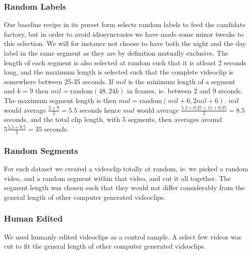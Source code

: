 \subsubsection{Random Labels}
% 
Our baseline recipe in its purest form selects random labels to feed the candidate factory, but in order to avoid idiosyncrasies we have made some minor tweaks to this selection. We will for instance not choose to have both the night and the day label in the same segment as they are by definition mutually exclusive. The length of each segment is also selected at random such that it is atleast 2 seconds long, and the maximum length is selected such that the complete videoclip is somewhere between 25-35 seconds. If $mil$ is the minimum length of a segment and $k=9$ then $mil=\text{random}(48,24k)$ in frames, ie. between 2 and 9 seconds. The maximum segment length is then $mal=\text{random}(mil+6, 2mil+6)$. $mil$ would average $\frac{2+9}{2}=5.5$ seconds hence $mal$ would average $\frac{5.5+0.25+11+0.25}{2}=8.5$ seconds, and the total clip length, with 5 segments, then averages around $5\frac{5.5+8.5}{2}=35$ seconds.
%
\subsubsection{Random Segments}
% 
For each dataset we created a videoclip totally at random, ie. we picked a random video, and a random segment within that video, and cut it all together. The segment length was chosen such that they would not differ considerably from the general length of other computer generated videoclips.
%
\subsubsection{Human Edited}
% 
We used humanly edited videoclips as a control sample. A select few videos was cut to fit the general length of other computer generated videoclips.
%
